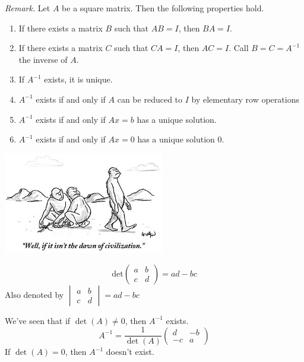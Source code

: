 \documentclass[10pt]{scrartcl}
\begin{document}
\emph{Remark.}
Let $A$ be a square matrix. Then the following properties hold. 	
\begin{enumerate}
\item If there exists a matrix $B$ such that $AB = I$, then $BA = I$.
\item If there exists a matrix $C$ such that $CA = I$, then $AC = I$. Call $B = C = A^{-1}$ the inverse of $A$. 
\item If $A^{-1}$ exists, it is unique. 
\item $A^{-1}$ exists if and only if $A$ can be reduced to $I$ by elementary row operations
\item $A^{-1}$ exists if and only if $Ax = b$ has a unique solution.
\item $A^{-1}$ exists if and only if $Ax = 0 $ has a unique solution $0$. 
\end{enumerate}

\vspace*{1cm}

\begin{center}
\includegraphics[width=7cm]{cartoon2.jpg}
\end{center}



\vsp

\begin{definition}
\[
  \mathrm{det}\begin{pmatrix}
a & b\\ c&d	
\end{pmatrix}
= ad - bc
\]
Also denoted by $\begin{vmatrix}
a & b \\ c & d	
\end{vmatrix} = ad - bc$
\end{definition}

We've seen that if $\det(A) \neq 0$, then $A^{-1}$ exists. 
\[
  A^{-1} = \frac{1}{\det(A)} \begin{pmatrix}
 d & -b\\ -c & a	
 \end{pmatrix}
\]
If $\det(A) = 0$, then $A^{-1}$ doesn't exist.\\
\end{document}

